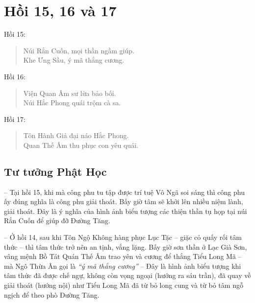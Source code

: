\chapter{Hồi 15, 16 và 17} %
\label{cha:hoi_15_16_17}

Hồi 15:

\begin{verse}
\begin{itshape}
Núi Rắn Cuốn, mọi thần ngầm giúp.\\
Khe Ưng Sầu, ý mã thắng cương.
\end{itshape}
\end{verse}

Hồi 16:

\begin{verse}
\begin{itshape}
Viện Quan Âm sư lừa bảo bối.\\
Núi Hắc Phong quái trộm cà sa.
\end{itshape}
\end{verse}

Hồi 17:

\begin{verse}
\begin{itshape}
Tôn Hành Giả đại náo Hắc Phong.\\
Quan Thế Âm thu phục con yêu quái.
\end{itshape}
\end{verse}

\section{Tư tưởng Phật Học} %
\label{sec:15_phat_hoc}

-- Tại hồi 15, khi mà công phu tu tập được trí tuệ Vô Ngã soi sáng thì công phu ấy đúng nghĩa là công phu giải thoát. Bấy giờ tâm sẽ khởi lên nhiều niệm lành, giải thoát. Đây là ý nghĩa của hình ảnh biểu tượng các thiện thần tụ họp tại núi Rắn Cuốn để giúp đỡ Đường Tăng.

-- Ở hồi 14, sau khi Tôn Ngộ Không hàng phục Lục Tặc -- giặc cỏ quấy rối tâm thức -- thì tâm thức trở nên an tịnh, vắng lặng. Bấy giờ sơn thần ở Lạc Già Sơn, vâng mệnh Bồ Tát Quán Thế Âm trao yên và cương để thắng Tiểu Long Mã -- mà Ngô Thừa Ân gọi là \emph{``ý mã thắng cương''} -- Đây là hình ảnh biểu tượng khi tâm thức đã được chế ngự, không còn vọng ngoại (hướng ra sáu trần), đã quay về giải thoát (hướng nội) như Tiểu Long Mã đã từ bỏ long cung và từ bỏ tâm ngỗ ngịch để theo phò Đường Tăng.

